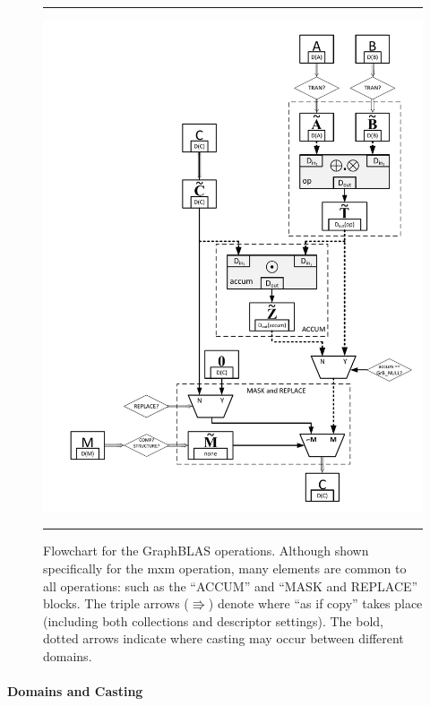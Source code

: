 \begin{figure}[p]
    \hrule
    \begin{center}
        \includegraphics[width=5.5in]{mxm_operation_flowchart_1_3d.pdf}
    \end{center}
    \caption{Flowchart for the GraphBLAS operations. Although shown specifically for
	the {\sf mxm} operation, many elements are common to all operations: such as the 
	``{\sf ACCUM}'' and ``{\sf MASK and REPLACE}'' blocks.  The triple arrows 
    ($\Rrightarrow$) denote where ``as if copy'' takes place (including both 
    collections and descriptor settings).  The bold, dotted arrows indicate
    where casting may occur between different domains. }
    \label{Fig:mxmFlowchart}
    \hrule
\end{figure}

\paragraph{Domains and Casting}

